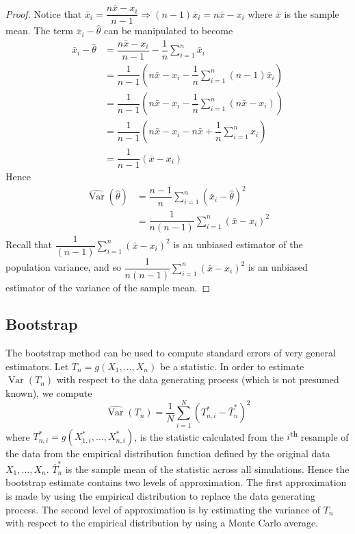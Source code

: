 \documentclass[11pt]{report} %
\begin{document}
\begin{proof}
Notice that $\bar{x}_{i} = \dfrac{n\bar{x} - x_{i}}{n - 1} \Rightarrow \left(n - 1\right)\bar{x}_{i} = n\bar{x} - x_{i}$ where $\bar{x}$ is the sample mean. The term $\bar{x}_{i} - \hat{\theta}$ can be manipulated to become
\begin{align}
\bar{x}_{i} - \hat{\theta} &= \dfrac{n\bar{x} - x_{i}}{n - 1} - \dfrac{1}{n}\sum_{i = 1}^{n}\bar{x}_{i} \\
&= \dfrac{1}{n - 1}\left(n\bar{x} - x_{i} - \dfrac{1}{n}\sum_{i = 1}^{n}\left(n - 1\right)\bar{x}_{i}\right) \\
&= \dfrac{1}{n - 1}\left(n\bar{x} - x_{i} - \dfrac{1}{n}\sum_{i = 1}^{n}\left(n\bar{x} - x_{i}\right)\right) \\
&= \dfrac{1}{n - 1}\left(n\bar{x} - x_{i} - n\bar{x} + \dfrac{1}{n}\sum_{i = 1}^{n}x_{i}\right) \\
&= \dfrac{1}{n - 1}\left(\bar{x} - x_{i}\right)
\end{align}
Hence
\begin{align}
\widehat{\operatorname{Var}}\left(\hat{\theta}\right) &= \dfrac{n - 1}{n}\sum_{i = 1}^{n}\left(\bar{x}_{i} - \hat{\theta}\right)^{2} \\
&= \dfrac{1}{n\left(n - 1\right)}\sum_{i = 1}^{n}\left(\bar{x} - x_{i}\right)^{2}
\end{align}
Recall that $\dfrac{1}{\left(n - 1\right)}\sum_{i = 1}^{n}\left(\bar{x} - x_{i}\right)^{2}$ is an unbiased estimator of the population variance, and so $\dfrac{1}{n\left(n - 1\right)}\sum_{i = 1}^{n}\left(\bar{x} - x_{i}\right)^{2}$ is an unbiased estimator of the variance of the sample mean.
\end{proof}

\subsection{Bootstrap \cite{Wasserman2013}}

The bootstrap method can be used to compute standard errors of very general estimators. Let $T_{n} = g\left(X_{1}, \dots, X_{n}\right)$ be a statistic. In order to estimate $\operatorname{Var}\left(T_{n}\right)$ with respect to the data generating process (which is not presumed known), we compute
\begin{equation}
\widehat{\operatorname{Var}}\left(T_{n}\right) = \dfrac{1}{N}\sum_{i = 1}^{N}\left(T_{n, i}^{*} - \overline{T}_{n}^{*}\right)^{2}
\end{equation}
where $T_{n, i}^{*} = g\left(X_{1, i}^{*}, \dots, X_{n, i}^{*}\right)$, is the statistic calculated from the $i$\textsuperscript{th} resample of the data from the empirical distribution function defined by the original data $X_{1}, \dots, X_{n}$. $\overline{T}_{n}^{*}$ is the sample mean of the statistic across all simulations. Hence the bootstrap estimate contains two levels of approximation. The first approximation is made by using the empirical distribution to replace the data generating process. The second level of approximation is by estimating the variance of $T_{n}$ with respect to the empirical distribution by using a Monte Carlo average.
\end{document}
